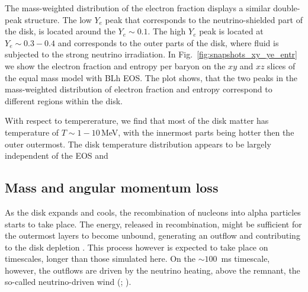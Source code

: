 The mass-weighted distribution 
of the electron fraction displays a similar double-peak structure.
The low $Y_e$ peak that corresponds to the neutrino-shielded part of the 
disk, is located around the $Y_e\sim0.1$. The high $Y_e$ peak is located at 
$Y_e\sim0.3-0.4$ and corresponds to the outer parts of the disk,
where fluid is subjected to the strong neutrino irradiation.
%
In Fig.~\ref{fig:snapshots_xy_ye_entr} we show the electron fraction 
and entropy per baryon on the $xy$ and $xz$ slices of the equal 
mass model with BLh \ac{EOS}. The plot shows, that the two peaks in the 
mass-weighted distribution of electron fraction and entropy correspond to 
different regions within the disk.

With respect to tempererature, we find that 
most of the disk matter has temperature of $T\sim 1-10\,$MeV, with the 
innermost parts being hotter then the outer outermost. 
The disk temperature distribution appears to be largely 
independent of the \ac{EOS} and \mr{}



\subsection{Mass and angular momentum loss}

As the disk expands and cools, the recombination of nucleons into alpha particles 
starts to take place. The energy, released in recombination, might be sufficient 
for the outermost layers to become unbound, generating an outflow and contributing 
to the disk depletion \citep{Beloborodov:2008nx,Lee:2009uc,Fernandez:2013tya}.
%
This process however is expected to take place on timescales, longer than
those simulated here. On the ${\sim}100$~ms timescale, however, the outflows 
are driven by the neutrino heating, above the remnant, the so-called neutrino-driven 
wind (\nwind{}; \citet{Dessart:2008zd,Perego:2014fma,Just:2014fka}). 
%

